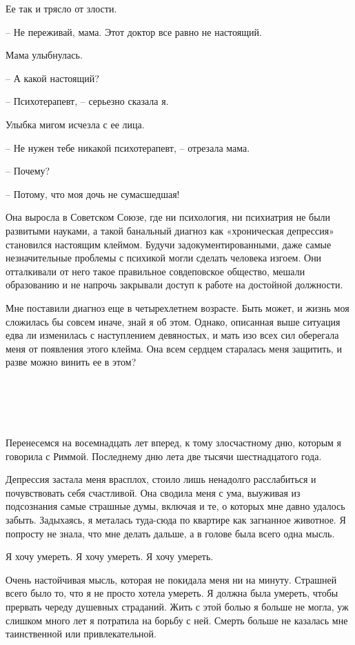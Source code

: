 \documentclass[
]{book}
\begin{document}
Ее так и трясло от злости.

-- Не переживай, мама. Этот доктор все равно не настоящий.

Мама улыбнулась.

-- А какой настоящий?

-- Психотерапевт, -- серьезно сказала я.

Улыбка мигом исчезла с ее лица.

-- Не нужен тебе никакой психотерапевт, -- отрезала мама.

-- Почему?

-- Потому, что моя дочь не сумасшедшая!

Она выросла в Советском Союзе, где ни психология, ни психиатрия не были развитыми науками, а такой банальный диагноз как «хроническая депрессия» становился настоящим клеймом. Будучи задокументированными, даже самые незначительные проблемы с психикой могли сделать человека изгоем. Они отталкивали от него такое правильное совдеповское общество, мешали образованию и не напрочь закрывали доступ к работе на достойной должности.

Мне поставили диагноз еще в четырехлетнем возрасте. Быть может, и жизнь моя сложилась бы совсем иначе, знай я об этом. Однако, описанная выше ситуация едва ли изменилась с наступлением девяностых, и мать изо всех сил оберегала меня от появления этого клейма. Она всем сердцем старалась меня защитить, и разве можно винить ее в этом?

\hypertarget{chapter-76}{%
\chapter{~}\label{chapter-76}}

Перенесемся на восемнадцать лет вперед, к тому злосчастному дню, которым я говорила с Риммой. Последнему дню лета две тысячи шестнадцатого года.

Депрессия застала меня врасплох, стоило лишь ненадолго расслабиться и почувствовать себя счастливой. Она сводила меня с ума, выуживая из подсознания самые страшные думы, включая и те, о которых мне давно удалось забыть. Задыхаясь, я металась туда-сюда по квартире как загнанное животное. Я попросту не знала, что мне делать дальше, а в голове была всего одна мысль.

Я хочу умереть. Я хочу умереть. Я хочу умереть.

Очень настойчивая мысль, которая не покидала меня ни на минуту. Страшней всего было то, что я не просто хотела умереть. Я должна была умереть, чтобы прервать череду душевных страданий. Жить с этой болью я больше не могла, уж слишком много лет я потратила на борьбу с ней. Смерть больше не казалась мне таинственной или привлекательной.
\end{document}
